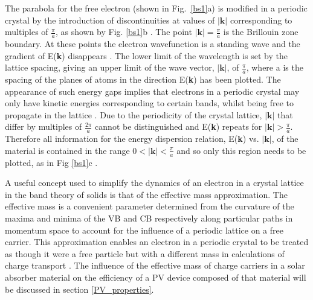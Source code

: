 \documentclass[11pt, twoside]{report}
\begin{document}
The parabola for the free electron (shown in  Fig.~\ref{bs1}a) is modified in a periodic crystal by the introduction of discontinuities at values of $|\textbf{k}|$ corresponding to multiples of $\frac{\pi}{a}$, as shown by Fig. \ref{bs1}b \cite{small_semiconductor2}. The point $|\textbf{k}| = \frac{\pi}{a}$ is the Brillouin zone boundary. At these points the electron wavefunction is a standing wave and the gradient of E(\textbf{k}) disappears \cite{Nelson3}.
The lower limit of the wavelength is set by the lattice spacing, giving an upper limit of the wave vector, $|\textbf{k}|$, of $\frac{\pi}{a}$, where a is the spacing of the planes of atoms in the direction E(\textbf{k}) has been plotted.  The appearance of such energy gaps implies that electrons in a periodic crystal may only have kinetic energies corresponding to certain bands, whilst being free to propagate in the lattice \cite{small_semiconductor2}.
Due to the periodicity of the crystal lattice, $|\textbf{k}|$  that differ by multiples of $\frac{2\pi}{a}$ cannot be distinguished and E(\textbf{k}) repeats for $|\textbf{k}| > \frac{\pi}{a}$. 
Therefore all information for the energy dispersion relation, E(\textbf{k}) vs. $|\textbf{k}|$, of the material is contained in the range $0 < |\textbf{k}| < \frac{\pi}{a}$ and so only this region needs to be plotted, as in Fig \ref{bs1}c \cite{Nelson3}. 

A useful concept used to simplify the dynamics of an electron in a crystal lattice in the band theory of solids is that of the effective mass approximation. The effective mass is a convenient parameter determined from the curvature of the maxima and minima of the VB and CB respectively along particular paths in momentum space to account for the influence of a periodic lattice on a free carrier. This approximation enables an electron in a periodic crystal to be treated as though it were a free particle but with a different mass in calculations of charge transport \cite{small_semiconductor2}.
The influence of the effective mass of charge carriers in a solar absorber material on the efficiency of a PV device composed of that material will be discussed in section \ref{PV_properties}.
\end{document}

